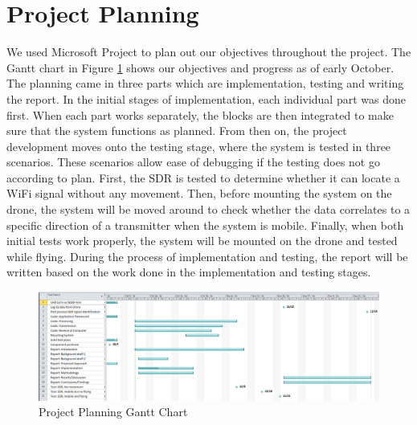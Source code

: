 \section{Project Planning}
We used Microsoft Project to plan out our objectives throughout the project. The Gantt chart in Figure \ref{fig:gantt_chart} shows our objectives and progress as of early October. The planning came in three parts which are implementation, testing and writing the report. In the initial stages of implementation, each individual part was done first. When each part works separately, the blocks are then integrated to make sure that the system functions as planned. From then on, the project development moves onto the testing stage, where the system is tested in three scenarios. These scenarios allow ease of debugging if the testing does not go according to plan. First, the SDR is tested to determine whether it can locate a WiFi signal without any movement. Then, before mounting the system on the drone, the system will be moved around to check whether the data correlates to a specific direction of a transmitter when the system is mobile. Finally, when both initial tests work properly, the system will be mounted on the drone and tested while flying. During the process of implementation and testing, the report will be written based on the work done in the implementation and testing stages.
\begin{figure}[ht]
\centering
\includegraphics[width=1.0\textwidth]{img/oct_gantt_chart.png}
\caption{Project Planning Gantt Chart}
\label{fig:gantt_chart}
\end{figure}

